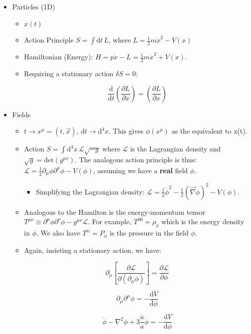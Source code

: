 \documentclass{article}
\newcommand{\be}{\begin{equation}}
\newcommand{\ee}{\end{equation}}
\begin{document}
\begin{itemize}
    \item Particles (1D)
    \begin{itemize}
        \item $x(t)$
        \item Action Principle $S = \int \mathrm{d}t \, L$, where $L = \frac12 m \dot{x}^2 - V(x)$
        \item Hamiltonian (Energy): $H = p \dot{x} - L = \frac12 m\dot{x}^2 + V(x)$. 
        \item Requiring a stationary action $\delta S = 0$:
        
        \be
        \frac{\mathrm{d}}{\mathrm{d}t} \left(\frac{\partial L}{\partial \dot{x}}\right)= \left(\frac{\partial L }{\partial x}\right)
        \ee
    \end{itemize}
    
    
    
    \item Fields
    \begin{itemize}
        \item $t \rightarrow x^\mu = (t, \vec{x})$, $\mathrm{d}t \rightarrow \mathrm{d}^4 x$. This gives $\phi(x^\mu)$ as the equivalent to x(t). 
        \item Action $S = \int \mathrm{d}^4x \, \mathcal{L} \sqrt{-g}$ where $\mathcal{L}$ is the Lagrangian density and $\sqrt{g} = \text{det}\left(g^{\mu\nu}\right)$. The analogous action principle is thus: $\mathcal{L} = \frac12 \partial_\mu \phi \partial^\mu \phi - V(\phi)$, assuming we have a \textbf{real} field $\phi$.
        \begin{itemize}
            \item Simplifying the Lagrangian density: $\mathcal{L} = \frac12 \dot{\phi}^2 - \frac12 \left(\vec{\nabla} \phi\right)^2 - V(\phi)$.
        \end{itemize}
        \item Analogous to the Hamilton is the energy-momentum tensor $T^{\mu\nu} \equiv \partial^\mu \phi \partial^\nu \phi - g^{\mu\nu}\mathcal{L}$. For example, $T^{00} = \rho_\phi$ which is the energy density in $\phi$. We also have $T^{ii} = P_\phi$ is the pressure in the field $\phi$. 
        \item Again, insisting a stationary action, we have:
        
        \be
        \partial_\mu \left[\frac{\partial \mathcal{L}}{\partial\left(\partial_\mu \phi\right)}\right] = \frac{\partial \mathcal{L}}{\partial \phi}
        \ee
        
        \be
        \partial_\mu \partial^\mu \phi = -\frac{\mathrm{d} V}{\mathrm{d}\phi}
        \ee
        
        \be
        \ddot{\phi} - \nabla^2 \phi + 3 \frac{\dot{a}}{a} \dot{\phi} = -\frac{\mathrm{d}V}{\mathrm{d}\phi}
        \ee
    \end{itemize}
\end{itemize}
\end{document}
